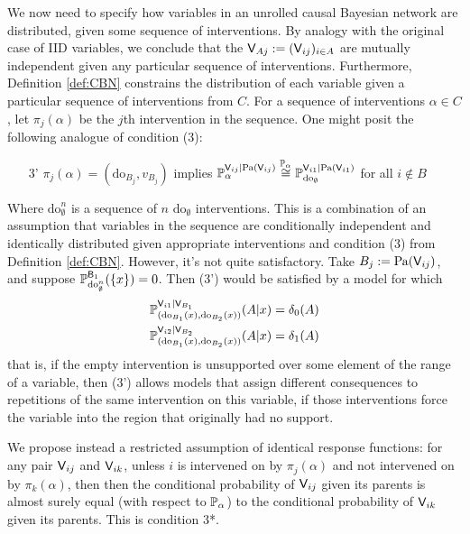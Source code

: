 We now need to specify how variables in an unrolled causal Bayesian network are distributed, given some sequence of interventions. By analogy with the original case of IID variables, we conclude that the $\mathsf{V}_{Aj}:=(\mathsf{V}_{ij})_{i\in A}$ are mutually independent given any particular sequence of interventions. Furthermore, Definition \ref{def:CBN} constrains the distribution of each variable given a particular sequence of interventions from $C$. For a sequence of interventions $\alpha\in C$, let $\pi_j(\alpha)$ be the $j$th intervention in the sequence. One might posit the following analogue of condition (3): 
\begin{itemize}
    \item [3'] $\pi_j(\alpha)=(\mathrm{do}_{B_j},v_{B_j})$ implies $\mathbb{P}_{\alpha}^{\mathsf{V}_{ij}|\mathrm{Pa}(\mathsf{V}_{ij})}\overset{\mathbb{P}_{\alpha}}{\cong}\mathbb{P}_{\mathrm{do}_{\emptyset}}^{\mathsf{V}_{i1}|\mathrm{Pa}(\mathsf{V}_{i1})}$ for all $i\not\in B$
\end{itemize}
Where $\mathrm{do}_{\emptyset}^n$ is a sequence of $n$ $\mathrm{do}_{\emptyset}$ interventions. This is a combination of an assumption that variables in the sequence are conditionally independent and identically distributed given appropriate interventions and condition (3) from Definition \ref{def:CBN}. However, it's not quite satisfactory. Take $B_j:=\mathrm{Pa}(\mathsf{V}_{ij})$, and suppose $\mathbb{P}_{\mathrm{do}_{\emptyset}^n}^{\mathsf{B}_{1}}(\{x\})=0$. Then (3') would be satisfied by a model for which
\begin{align}
    \mathbb{P}_{(\mathrm{do}_{B_1}(x),\mathrm{do}_{B_2}(x))}^{\mathsf{V}_{i1}|\mathsf{V}_{B_1}}(A|x) &= \delta_0(A)\\
    \mathbb{P}_{(\mathrm{do}_{B_1}(x),\mathrm{do}_{B_2}(x))}^{\mathsf{V}_{i2}|\mathsf{V}_{B_2}}(A|x) &= \delta_1(A)
\end{align}
that is, if the empty intervention is unsupported over some element of the range of a variable, then (3') allows models that assign different consequences to repetitions of the same intervention on this variable, if those interventions force the variable into the region that originally had no support.

We propose instead a restricted assumption of identical response functions: for any pair $\mathsf{V}_{ij}$ and $\mathsf{V}_{ik}$, unless $i$ is intervened on by $\pi_j(\alpha)$ and not intervened on by $\pi_{k}(\alpha)$, then then the conditional probability of $\mathsf{V}_{ij}$ given its parents is almost surely equal (with respect to $\mathbb{P}_\alpha$) to the conditional probability of $\mathsf{V}_{ik}$ given its parents. This is condition 3*.

